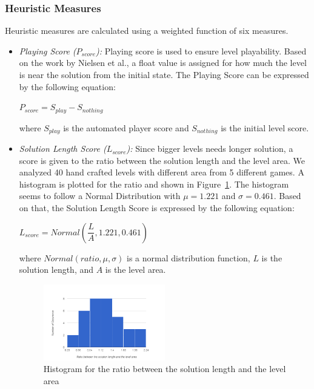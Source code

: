 \documentclass[letterpaper]{article}
\newcommand{\figref}[1]{Figure~\ref{Figure:#1}}
\begin{document}
\subsubsection{Heuristic Measures}
Heuristic measures are calculated using a weighted function of six measures.
\begin{itemize}
	\item \emph{Playing Score ($P_{score}$):} Playing score is used to ensure level playability. Based on the work by Nielsen et al.\cite{gvgpPerformanceProfiles}, a float value is assigned for how much the level is near the solution from the initial state. The Playing Score can be expressed by the following equation:
	\begin{center}$ P_{score} = S_{play} - S_{nothing}$\end{center}
	where $S_{play}$ is the automated player score and $S_{nothing}$ is the initial level score.
	
	\item\emph{Solution Length Score ($L_{score}$):} Since bigger levels needs longer solution, a score is given to the ratio between the solution length and the level area. We analyzed 40 hand crafted levels with different area from 5 different games. A histogram is plotted for the ratio and shown in \figref{solutionLengthHistogram}. The histogram seems to follow a Normal Distribution with $\mu = 1.221$ and $\sigma = 0.461$. Based on that, the Solution Length Score is expressed by the following equation:
	\begin{center}$L_{score} = Normal(\dfrac{L}{A}, 1.221, 0.461)$\end{center}
	where $Normal(ratio, \mu, \sigma)$ is a normal distribution function, $L$ is the solution length, and $A$ is the level area.
	\begin{figure}[ht]
		\centering
		\includegraphics[width=0.5\textwidth]{Images/solutionLengthHistogram}
		\caption{Histogram for the ratio between the solution length and the level area}
		\label{Figure:solutionLengthHistogram}
	\end{figure}
	

\end{itemize}
\end{document}
